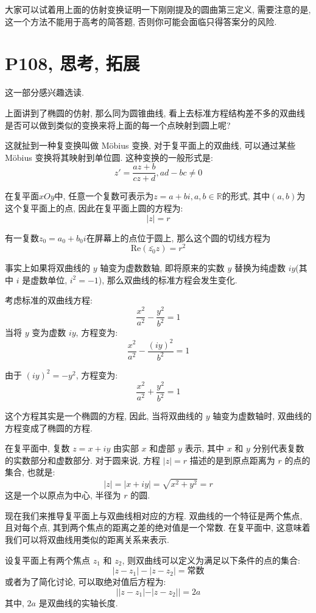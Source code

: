 \documentclass{book}
\begin{document}
    大家可以试着用上面的仿射变换证明一下刚刚提及的圆曲第三定义, 需要注意的是, 这一个方法不能用于高考的简答题, 否则你可能会面临只得答案分的风险.

    \section{\textcolor[rgb]{0.11,0.65,0.52}{P108, 思考, 拓展}}

    这一部分感兴趣选读.

    上面讲到了椭圆的仿射, 那么同为圆锥曲线, 看上去标准方程结构差不多的双曲线是否可以做到类似的变换来将上面的每一个点映射到圆上呢?

    这就扯到一种复变换叫做 Möbius 变换, 对于复平面上的双曲线, 可以通过某些 Möbius 变换将其映射到单位圆. 这种变换的一般形式是:$$z'=\frac{az+b}{cz+d},ad-bc\neq 0$$

    在复平面$xOy$中, 任意一个复数可表示为$z=a+bi,a,b\in \mathbb{R}$的形式, 其中$(a,b)$为这个复平面上的点, 因此在复平面上圆的方程为:$$\left| z \right|=r$$

    有一复数$z_0=a_0+b_0i$在屏幕上的点位于圆上, 那么这个圆的切线方程为$$\mathrm{Re}\left( \bar{z_0}z \right)=r^2$$

    事实上如果将双曲线的 \( y \) 轴变为虚数数轴, 即将原来的实数 \( y \) 替换为纯虚数 \( iy \)(其中 \( i \) 是虚数单位, \( i^2 = -1 \)), 那么双曲线的标准方程会发生变化.

    考虑标准的双曲线方程:
    \[
        \frac{x^2}{a^2} - \frac{y^2}{b^2} = 1
    \]
    当将 \( y \) 变为虚数 \( iy \), 方程变为:
    \[
        \frac{x^2}{a^2} - \frac{(iy)^2}{b^2} = 1
    \]

    由于 \( (iy)^2 = -y^2 \), 方程变为:
    \[
        \frac{x^2}{a^2} + \frac{y^2}{b^2} = 1
    \]

    这个方程其实是一个椭圆的方程, 因此, 当将双曲线的 \( y \) 轴变为虚数轴时, 双曲线的方程变成了椭圆的方程.

    在复平面中, 复数 \( z = x + iy \) 由实部 \( x \) 和虚部 \( y \) 表示, 其中 \( x \) 和 \( y \) 分别代表复数的实数部分和虚数部分. 对于圆来说, 方程 \( |z| = r \) 描述的是到原点距离为 \( r \) 的点的集合, 也就是:
    \[
        |z| = |x + iy| = \sqrt{x^2 + y^2} = r
    \]
    这是一个以原点为中心, 半径为 \( r \) 的圆.

    现在我们来推导复平面上与双曲线相对应的方程. 双曲线的一个特征是两个焦点, 且对每个点, 其到两个焦点的距离之差的绝对值是一个常数. 在复平面中, 这意味着我们可以将双曲线用类似的距离关系来表示.

    设复平面上有两个焦点 \( z_1 \) 和 \( z_2 \), 则双曲线可以定义为满足以下条件的点的集合:
    \[
        |z - z_1| - |z - z_2| = \text{常数}
    \]
    或者为了简化讨论, 可以取绝对值后方程为:
    \[
        ||z - z_1| - |z - z_2|| = 2a
    \]
    其中, \( 2a \) 是双曲线的实轴长度.
\end{document}

